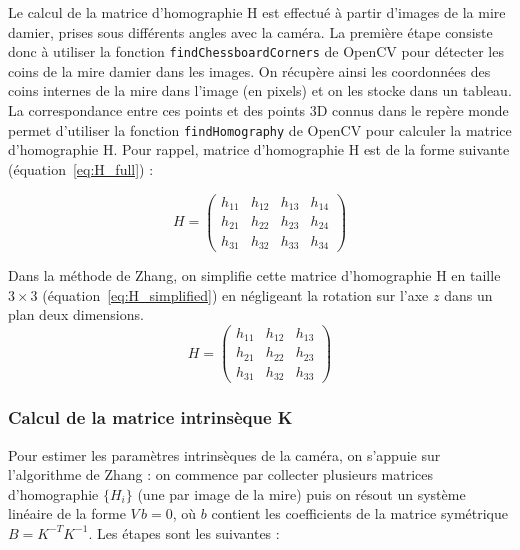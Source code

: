 \documentclass[12pt]{article}
\begin{document}
Le calcul de la matrice d'homographie H est effectué à partir d'images de la mire damier, prises sous différents angles avec la caméra.
La première étape consiste donc à utiliser la fonction \texttt{findChessboardCorners} de OpenCV pour détecter les coins de la mire damier dans les images.
On récupère ainsi les coordonnées des coins internes de la mire dans l'image (en pixels) et on les stocke dans un tableau.
La correspondance entre ces points et des points 3D connus dans le repère monde permet d'utiliser la fonction \texttt{findHomography} de OpenCV pour calculer la matrice d'homographie H.
Pour rappel, matrice d'homographie H est de la forme suivante (équation~\ref{eq:H_full}) :

\begin{equation}
    H
=
\begin{pmatrix}
h_{11} & h_{12} & h_{13} & h_{14} \\
h_{21} & h_{22} & h_{23} & h_{24} \\
h_{31} & h_{32} & h_{33} & h_{34}
\end{pmatrix}
\label{eq:H_full}
\end{equation}

Dans la méthode de Zhang, on simplifie cette matrice d'homographie H en taille \(3 \times 3\) (équation~\ref{eq:H_simplified}) en négligeant la rotation sur l'axe \(z\) dans un plan deux dimensions.
\begin{equation}
    H
=
\begin{pmatrix}
h_{11} & h_{12} & h_{13} \\
h_{21} & h_{22} & h_{23} \\
h_{31} & h_{32} & h_{33}
\end{pmatrix}
\label{eq:H_simplified}
\end{equation}

\subsubsection{Calcul de la matrice intrinsèque K}

Pour estimer les paramètres intrinsèques de la caméra, on s’appuie sur l’algorithme de Zhang : on commence par collecter plusieurs matrices d’homographie \(\{H_i\}\) (une par image de la mire) puis on résout un système linéaire de la forme \(V\,b = 0\), où \(b\) contient les coefficients de la matrice symétrique \(B = K^{-T} K^{-1}\). Les étapes sont les suivantes :
\end{document}
